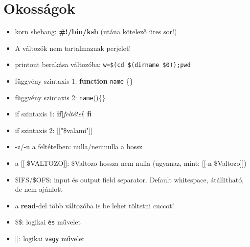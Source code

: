 \documentclass{article}
\begin{document}
\section{Okosságok}
\begin{itemize}
	\item korn shebang: \textbf{\#!/bin/ksh} (utána kötelező üres sor!)
	\item A változók nem tartalmaznak perjelet!
	\item printout berakása változóba: \texttt{w=\$(cd \$(dirname \$0));pwd}
	\item függvény szintaxis 1: \textbf{function} \texttt{name} \{\}
	\item függvény szintaxis 2: \texttt{name}()\{\}
	\item if szintaxis 1: \textbf{if}[\textit{feltétel}] \textbf{fi}
	\item if szintaxis 2: [["\$valami"]]
	\item -z/-n a feltételben: nulla/nemnulla a hossz
	\item a [[ \$VALTOZO]]: \$Valtozo hossza nem nulla (ugyanaz, mint: [[-n \$Valtozo]])
	\item \$IFS/\$OFS: input és output field separator. Default whitespace, átállitható, de nem ajánlott
	\item a \textbf{read}-del több változóba is be lehet töltetni cuccot!
	\item \$\$: logikai \texttt{és} művelet
	\item $||$: logikai \texttt{vagy} művelet
	
\end{itemize}
\end{document}
